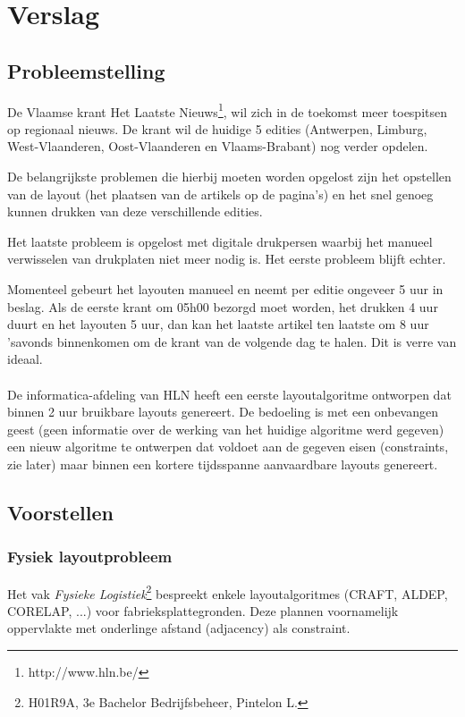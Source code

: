 \documentclass[a4paper,12pt]{report}
\begin{document}
\chapter{Verslag}
	\section{Probleemstelling}
De Vlaamse krant Het Laatste Nieuws\footnote{http://www.hln.be/}, wil zich in de toekomst meer toespitsen op regionaal nieuws. De krant wil de huidige 5 edities (Antwerpen, Limburg, West-Vlaanderen, Oost-Vlaanderen en Vlaams-Brabant) nog verder opdelen.

De belangrijkste problemen die hierbij moeten worden opgelost zijn het opstellen van de layout (het plaatsen van de artikels op de pagina's) en het snel genoeg kunnen drukken van deze verschillende edities.

Het laatste probleem is opgelost met digitale drukpersen waarbij het manueel verwisselen van drukplaten niet meer nodig is. Het eerste probleem blijft echter.

Momenteel gebeurt het layouten manueel en neemt per editie ongeveer 5 uur in beslag. Als de eerste krant om 05h00 bezorgd moet worden, het drukken 4 uur duurt en het layouten 5 uur, dan kan het laatste artikel ten laatste om 8 uur 'savonds binnenkomen om de krant van de volgende dag te halen. Dit is verre van ideaal.
\\ 
\\
De informatica-afdeling van HLN heeft een eerste layoutalgoritme ontworpen dat binnen 2 uur bruikbare layouts genereert. De bedoeling is met een onbevangen geest (geen informatie over de werking van het huidige algoritme werd gegeven) een nieuw algoritme te ontwerpen dat voldoet aan de gegeven eisen (constraints, zie later) maar binnen een kortere tijdsspanne aanvaardbare layouts genereert.


	\section{Voorstellen}
		\subsection{Fysiek layoutprobleem}
Het vak \textit{Fysieke Logistiek}\footnote{H01R9A, 3e Bachelor Bedrijfsbeheer, Pintelon L.} bespreekt enkele layoutalgoritmes (CRAFT, ALDEP, CORELAP, ...) voor fabrieksplattegronden. Deze plannen voornamelijk oppervlakte met onderlinge afstand (adjacency) als constraint.
\end{document}
